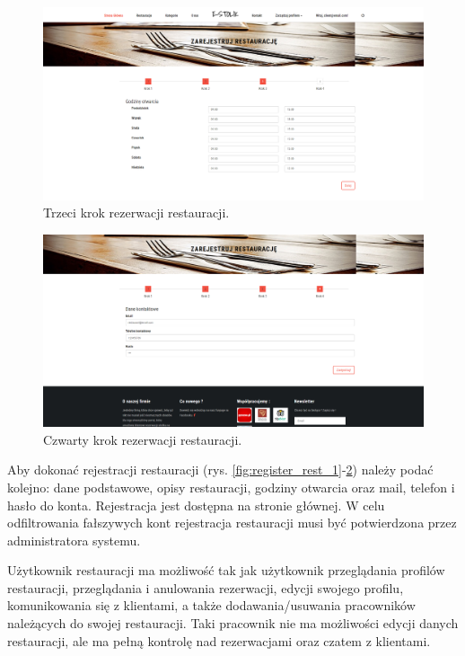 \documentclass{article}
\begin{document}
\begin{figure}[H]
\centering
	\includegraphics[width=1.00\textwidth]{screens/register_rest_3.png}
	\caption{Trzeci krok rezerwacji restauracji.}
	\label{fig:register_rest_3}
\end{figure}

\begin{figure}[H]
\centering
	\includegraphics[width=1.00\textwidth]{screens/register_rest_4.png}
	\caption{Czwarty krok rezerwacji restauracji.}
	\label{fig:register_rest_4}
\end{figure}

Aby dokonać rejestracji restauracji (rys. \ref{fig:register_rest_1}-\ref{fig:register_rest_4}) należy podać kolejno: dane podstawowe, opisy restauracji, godziny otwarcia oraz mail, telefon i hasło do konta. Rejestracja jest dostępna na stronie głównej. W celu odfiltrowania fałszywych kont rejestracja restauracji musi być potwierdzona przez administratora systemu.


Użytkownik restauracji ma możliwość tak jak użytkownik przeglądania profilów restauracji, przeglądania i anulowania rezerwacji, edycji swojego profilu, komunikowania się z klientami, a także dodawania/usuwania pracowników należących do swojej restauracji. Taki pracownik nie ma możliwości edycji danych restauracji, ale ma pełną kontrolę nad rezerwacjami oraz czatem z klientami.
\end{document}
